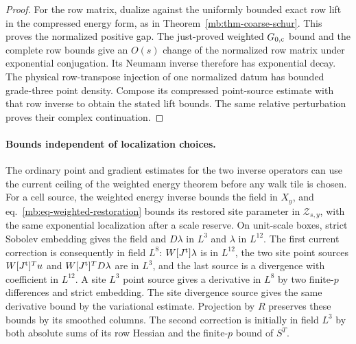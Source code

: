 \documentclass[11pt,letterpaper,reqno]{amsart}
\numberwithin{equation}{section}
\renewcommand{\eqref}[1]{\textup{eq.~\ref{#1}}}
\theoremstyle{definition}
\theoremstyle{remark}
\begin{document}
\begin{proof}
For the row matrix, dualize against the uniformly bounded exact row
lift in the compressed energy form, as in
Theorem~\ref{mb:thm-coarse-schur}. This proves the normalized
positive gap. The just-proved weighted $G_{0,\rm c}$ bound
and the complete row bounds give an $O(s)$ change of the
normalized row matrix under exponential conjugation.
Its Neumann inverse therefore has exponential decay.
The physical row-transpose injection of one normalized
datum has bounded grade-three point density. Compose its
compressed point-source estimate with that row inverse
to obtain the stated lift bounds. The same relative
perturbation proves their complex continuation.
\end{proof}

\paragraph{Bounds independent of localization choices.}
The ordinary point and gradient estimates for the two inverse operators can use the current ceiling of the weighted energy theorem before any walk tile is chosen. For a cell source, the weighted energy inverse bounds the field in \(X_y\), and \eqref{mb:eq-weighted-restoration} bounds its restored site parameter in \(\mathcal Z_{s,y}\), with the same exponential localization after a scale reserve. On unit-scale boxes, strict Sobolev embedding gives the field and \(D\lambda\) in \(L^3\) and \(\lambda\) in \(L^{12}\). The first current correction is consequently in field \(L^8\): \(W[J^{\rm t}]\lambda\) is in \(L^{12}\), the two site point sources \(W[J^{\rm t}]^Tu\) and \(W[J^{\rm t}]^TD\lambda\) are in \(L^3\), and the last source is a divergence with coefficient in \(L^{12}\). A site \(L^3\) point source gives a derivative in \(L^8\) by two finite-\(p\) differences and strict embedding. The site divergence source gives the same derivative bound by the variational estimate. Projection by \(R\) preserves these bounds by its smoothed columns. The second correction is initially in field \(L^3\) by both absolute sums of its row Hessian and the finite-\(p\) bound of \(S^T\).
\end{document}
